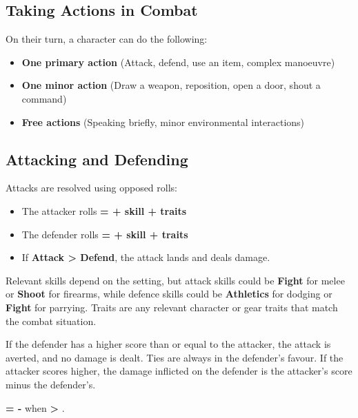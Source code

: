 \begin{multicols}{2}
\subsection{Taking Actions in Combat}

On their turn, a character can do the following:
\begin{itemize}
    \item \textbf{One primary action} (Attack, defend, use an item, complex manoeuvre)
    \item \textbf{One minor action} (Draw a weapon, reposition, open a door, shout a command)
    \item \textbf{Free actions} (Speaking briefly, minor environmental interactions)
\end{itemize}

\subsection{Attacking and Defending}

Attacks are resolved using opposed rolls:
\begin{Example}
	\begin{itemize}
    	\item The attacker rolls \textbf{\Attack = \FudgeRoll + skill + traits}
	    \item The defender rolls \textbf{\Defend = \FudgeRoll + skill + traits} 	    
	    \item If \textbf{Attack > Defend}, the attack lands and deals damage.
	\end{itemize}
\end{Example}

Relevant skills depend on the setting, but attack skills could be \textbf{Fight} for melee or \textbf{Shoot} for firearms, while defence skills could be \textbf{Athletics} for dodging or \textbf{Fight} for parrying. Traits are any relevant character or gear traits that match the combat situation.

If the defender has a higher score than or equal to the attacker, the attack is averted, and no damage is dealt. Ties are always in the defender's favour. If the attacker scores higher, the damage inflicted on the defender is the attacker's score minus the defender's.

\begin{Example}
    \textbf{\Damage = \Attack - \Defend} when \textbf{\Attack > \Defend}.
\end{Example}


\end{multicols}

